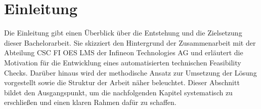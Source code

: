 \chapter{Einleitung}

Die Einleitung gibt einen Überblick über die Entstehung und die Zielsetzung dieser Bachelorarbeit. Sie skizziert den Hintergrund der Zusammenarbeit mit der Abteilung CSC FI OES LMS der Infineon Technologies AG und erläutert die Motivation für die Entwicklung eines automatisierten technischen Feasibility Checks. Darüber hinaus wird der methodische Ansatz zur Umsetzung der Lösung vorgestellt sowie die Struktur der Arbeit näher beleuchtet. Dieser Abschnitt bildet den Ausgangspunkt, um die nachfolgenden Kapitel systematisch zu erschließen und einen klaren Rahmen dafür zu schaffen.













